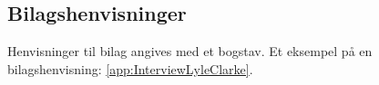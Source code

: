 \subsection*{Bilagshenvisninger}
Henvisninger til bilag angives med et bogstav. Et eksempel på en bilagshenvisning: \autoref{app:InterviewLyleClarke}.
%
%
